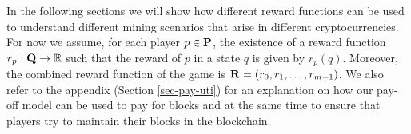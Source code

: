 In the following sections we will show how different reward functions can be used to understand different mining scenarios that arise in different cryptocurrencies. 
For now we assume, for each player $p \in \mathbf{P}$, the existence of a reward function $r_p : \mathbf{Q} \to \mathbb{R}$ such that the reward of $p$ in a state $q$ is given by $r_p(q)$. Moreover, the combined reward function of the game is $\mathbf{R} = (r_0, r_1, \ldots, r_{m-1})$. We also refer to the appendix (Section \ref{sec-pay-uti}) for an explanation on how 
our pay-off model can be used to pay for blocks and at the same time to ensure that players try to maintain their blocks in the blockchain.






